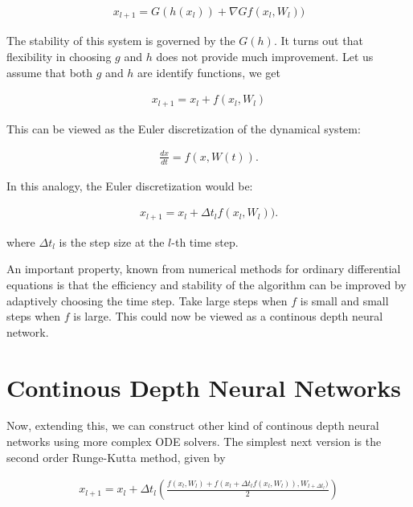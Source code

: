 \documentclass[book.tex]{subfiles}
\begin{document}
\begin{align}
x_{l+1} = G(h(x_l))+\nabla G f(x_l,W_l))
\end{align}

The stability of this system is governed by the $G(h)$.  It turns out that flexibility in choosing $g$ and $h$ does not provide much improvement.  Let us assume that both $g$ and $h$ are identify functions, we get

\begin{align}
x_{l+1} = x_l+ f(x_l,W_l)
\end{align}

This can be viewed as the Euler discretization of the dynamical system:

\begin{align}
\frac{dx}{dt} = f(x,W(t)).
\end{align}

In this analogy, the Euler discretization would be:

\begin{align}
x_{l+1} = x_l+ \Delta t_l f(x_l,W_l)).
\end{align}

where $\Delta t_l$ is the step size at the $l$-th time step.

An important property, known from numerical methods for ordinary differential equations is that the efficiency and stability of the algorithm can be improved by adaptively choosing the time step.  Take large steps when $f$ is small and small steps when $f$ is large.  This could now be viewed as a continous depth neural network.

\section{Continous Depth Neural Networks}

Now, extending this, we can construct other kind of continous depth neural networks using more complex ODE solvers.  The simplest next version is the second order Runge-Kutta method, given by \cite{wang1998runge}

\begin{align}
x_{l+1} = x_l+ \Delta t_l  \left(\frac{f(x_l,W_l)+f(x_l+\Delta t_l f(x_l,W_l)),W_{l+\Delta t_l})}{2}\right)
\end{align}

\end{document}
